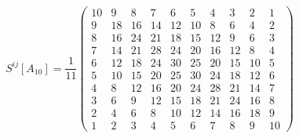 \begin{equation}
S^{ij} [A_{10}]= \frac1{11}
\left(\begin{array}{cccccccccc}
   10 & 9 & 8 & 7 & 6 & 5 & 4 & 3 & 2 & 1 \\
   9 & 18 & 16 & 14 & 12 & 10 & 8 & 6 & 4 & 2 \\
   8 & 16 & 24 & 21 & 18 & 15 & 12 & 9 & 6 & 3 \\
   7 & 14 & 21 & 28 & 24 & 20 & 16 & 12 & 8 & 4 \\
   6 & 12 & 18 & 24 & 30 & 25 & 20 & 15 & 10 & 5 \\
   5 & 10 & 15 & 20 & 25 & 30 & 24 & 18 & 12 & 6 \\
   4 & 8 & 12 & 16 & 20 & 24 & 28 & 21 & 14 & 7 \\
   3 & 6 & 9 & 12 & 15 & 18 & 21 & 24 & 16 & 8 \\
   2 & 4 & 6 & 8 & 10 & 12 & 14 & 16 & 18 & 9 \\
   1 & 2 & 3 & 4 & 5 & 6 & 7 & 8 & 9 & 10
\end{array}\right)
\end{equation}

